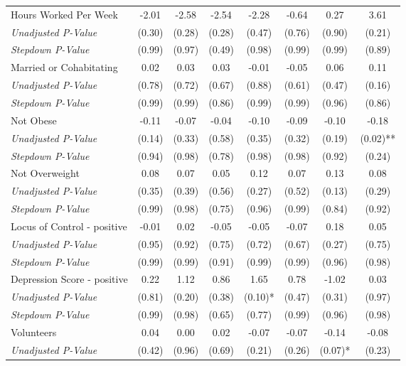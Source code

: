 \begin{tabular}{l c c c c c c c}
Hours Worked Per Week & -2.01 & -2.58 & -2.54 & -2.28 & -0.64 & 0.27 & 3.61 \\
\quad \textit{Unadjusted P-Value} & (0.30) & (0.28) & (0.28) & (0.47) & (0.76) & (0.90) & (0.21) \\
\quad \textit{Stepdown P-Value} & (0.99) & (0.97) & (0.49) & (0.98) & (0.99) & (0.99) & (0.89) \\
Married or Cohabitating & 0.02 & 0.03 & 0.03 & -0.01 & -0.05 & 0.06 & 0.11 \\
\quad \textit{Unadjusted P-Value} & (0.78) & (0.72) & (0.67) & (0.88) & (0.61) & (0.47) & (0.16) \\
\quad \textit{Stepdown P-Value} & (0.99) & (0.99) & (0.86) & (0.99) & (0.99) & (0.96) & (0.86) \\
Not Obese & -0.11 & -0.07 & -0.04 & -0.10 & -0.09 & -0.10 & -0.18 \\
\quad \textit{Unadjusted P-Value} & (0.14) & (0.33) & (0.58) & (0.35) & (0.32) & (0.19) & (0.02)** \\
\quad \textit{Stepdown P-Value} & (0.94) & (0.98) & (0.78) & (0.98) & (0.98) & (0.92) & (0.24) \\
Not Overweight & 0.08 & 0.07 & 0.05 & 0.12 & 0.07 & 0.13 & 0.08 \\
\quad \textit{Unadjusted P-Value} & (0.35) & (0.39) & (0.56) & (0.27) & (0.52) & (0.13) & (0.29) \\
\quad \textit{Stepdown P-Value} & (0.99) & (0.98) & (0.75) & (0.96) & (0.99) & (0.84) & (0.92) \\
Locus of Control - positive & -0.01 & 0.02 & -0.05 & -0.05 & -0.07 & 0.18 & 0.05 \\
\quad \textit{Unadjusted P-Value} & (0.95) & (0.92) & (0.75) & (0.72) & (0.67) & (0.27) & (0.75) \\
\quad \textit{Stepdown P-Value} & (0.99) & (0.99) & (0.91) & (0.99) & (0.99) & (0.96) & (0.98) \\
Depression Score - positive & 0.22 & 1.12 & 0.86 & 1.65 & 0.78 & -1.02 & 0.03 \\
\quad \textit{Unadjusted P-Value} & (0.81) & (0.20) & (0.38) & (0.10)* & (0.47) & (0.31) & (0.97) \\
\quad \textit{Stepdown P-Value} & (0.99) & (0.98) & (0.65) & (0.77) & (0.99) & (0.96) & (0.98) \\
Volunteers & 0.04 & 0.00 & 0.02 & -0.07 & -0.07 & -0.14 & -0.08 \\
\quad \textit{Unadjusted P-Value} & (0.42) & (0.96) & (0.69) & (0.21) & (0.26) & (0.07)* & (0.23) \\

\end{tabular}
